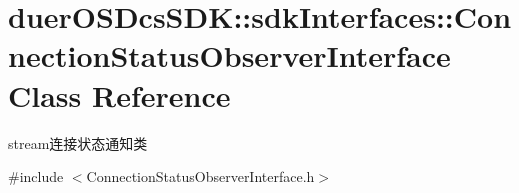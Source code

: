 \hypertarget{classduerOSDcsSDK_1_1sdkInterfaces_1_1ConnectionStatusObserverInterface}{}\section{duer\+O\+S\+Dcs\+S\+DK\+:\+:sdk\+Interfaces\+:\+:Connection\+Status\+Observer\+Interface Class Reference}
\label{classduerOSDcsSDK_1_1sdkInterfaces_1_1ConnectionStatusObserverInterface}


stream连接状态通知类  




{\ttfamily \#include $<$Connection\+Status\+Observer\+Interface.\+h$>$}

